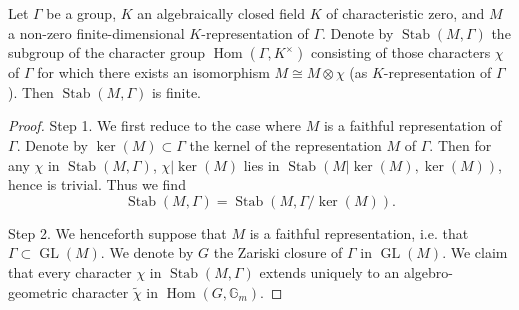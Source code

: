 Let \(\Gamma\) be a group, \(K\) an algebraically closed field \(K\) of
characteristic zero, and \(M\) a non-zero finite-dimensional
\(K\)-representation of \(\Gamma\). Denote by \(\operatorname{Stab}(M,\Gamma)\)
the subgroup of the character group \(\operatorname{Hom}(\Gamma,K^\times)\)
consisting of those characters \(\chi\) of \(\Gamma\) for which there exists an
isomorphism \(M\cong M\otimes\chi\) (as \(K\)-representation of \(\Gamma\)).
Then \(\operatorname{Stab}(M,\Gamma)\) is finite.
\begin{proof}
Step 1. We first reduce to the case where \(M\) is a faithful representation
of \(\Gamma\). Denote by \(\ker(M)\subset\Gamma\) the kernel of the
representation \(M\) of \(\Gamma\). Then for any \(\chi\) in
\(\operatorname{Stab}(M,\Gamma)\), \(\chi|\ker(M)\) lies in
\(\operatorname{Stab}(M|\ker(M),\ker(M))\), hence is trivial. Thus we find
\[
  \operatorname{Stab}(M,\Gamma)
  =
  \operatorname{Stab}(M,\Gamma/\ker(M)).
\]

Step 2. We henceforth suppose that \(M\) is a faithful representation, i.e.
that \(\Gamma\subset\operatorname{GL}(M)\). We denote by \(G\) the Zariski
closure of \(\Gamma\) in \(\operatorname{GL}(M)\). We claim that every
character \(\chi\) in \(\operatorname{Stab}(M,\Gamma)\) extends uniquely to an
algebro-geometric character \(\widetilde{\chi}\) in
\(\operatorname{Hom}(G,\mathbb{G}_m)\).


\end{proof}
